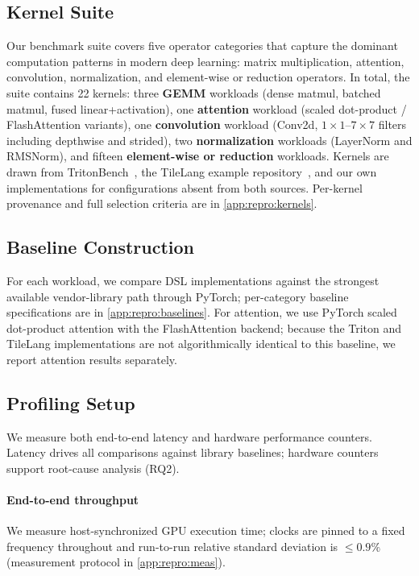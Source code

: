 \subsection{Kernel Suite}
\label{sec:meth:kernels}

Our benchmark suite covers five operator categories that capture the dominant computation patterns in modern deep learning: matrix multiplication, attention, convolution, normalization, and element-wise or reduction operators.
In total, the suite contains 22 kernels: three \textbf{GEMM} workloads (dense matmul, batched matmul, fused linear+activation), one \textbf{attention} workload (scaled dot-product / FlashAttention variants), one \textbf{convolution} workload (Conv2d, $1\times1$--$7\times7$ filters including depthwise and strided), two \textbf{normalization} workloads (LayerNorm and RMSNorm), and fifteen \textbf{element-wise or reduction} workloads.
Kernels are drawn from TritonBench~\cite{li2025tritonbench}, the TileLang example repository~\cite{wang2025tilelang}, and our own implementations for configurations absent from both sources.
Per-kernel provenance and full selection criteria are in \cref{app:repro:kernels}.


\subsection{Baseline Construction}
\label{sec:meth:baselines}

For each workload, we compare DSL implementations against the strongest available vendor-library path through PyTorch; per-category baseline specifications are in \cref{app:repro:baselines}.
For attention, we use PyTorch scaled dot-product attention with the FlashAttention backend; because the Triton and TileLang implementations are not algorithmically identical to this baseline, we report attention results separately.


\subsection{Profiling Setup}
\label{sec:meth:profiling}

We measure both end-to-end latency and hardware performance counters.
Latency drives all comparisons against library baselines; hardware counters support root-cause analysis (RQ2).

\paragraph{End-to-end throughput}
We measure host-synchronized GPU execution time; clocks are pinned to a fixed frequency throughout and run-to-run relative standard deviation is $\leq 0.9\%$ (measurement protocol in \cref{app:repro:meas}).

